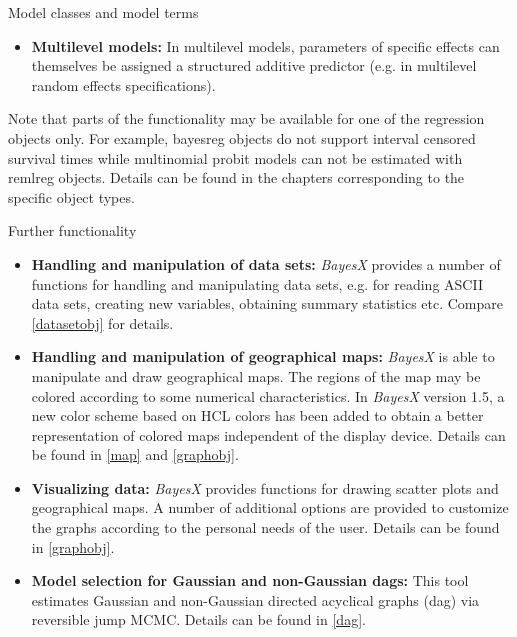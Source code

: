 \begin{stanza}{Model classes and model terms}
\begin{itemize}
\item {\bf\sffamily Multilevel models:} In multilevel models, parameters of specific effects can themselves be assigned a structured additive predictor (e.g. in multilevel random effects specifications).
\end{itemize}

Note that parts of the functionality may be available for one of the regression objects only. For example, bayesreg objects do
not support interval censored survival times while multinomial probit models can not be estimated with remlreg objects. Details
can be found in the chapters corresponding to the specific object types.
\end{stanza}

\begin{stanza}{Further functionality}

\begin{itemize}
\item{\bf\sffamily Handling and manipulation of data sets:} {\em
BayesX} provides a number of functions for handling and
manipulating data sets, e.g. for reading ASCII data sets, creating
new variables, obtaining summary statistics etc. Compare
\autoref{datasetobj} for details.

\item{\bf\sffamily Handling and manipulation of geographical
maps:} {\em BayesX} is able to manipulate and draw geographical
maps. The regions of the map may be colored according to some
numerical characteristics. In {\em BayesX} version 1.5, a new
color scheme based on HCL colors has been added to obtain a better
representation of colored maps independent of the display device.
Details can be found in \autoref{map} and \autoref{graphobj}.

\item{\bf\sffamily Visualizing data:} {\em BayesX} provides
functions for drawing scatter plots and geographical maps. A
number of additional options are provided to customize the graphs
according to the personal needs of the user. Details can be found
in \autoref{graphobj}.

\item{\bf\sffamily Model selection for Gaussian and non-Gaussian
dags:} This tool estimates Gaussian and non-Gaussian directed
acyclical graphs (dag) via reversible jump MCMC. Details can be
found in \autoref{dag}.
\end{itemize}
\end{stanza}


